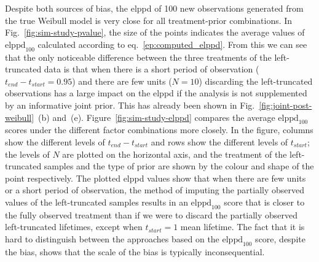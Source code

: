 Despite both sources of bias, the elppd of 100 new observations generated from the true Weibull model is very close for all treatment-prior combinations. In Fig.~\ref{fig:sim-study-pvalue}, the size of the points indicates the average values of $\text{elppd}_{100}$ calculated according to eq.~\eqref{ep:computed_elppd}. From this we can see that the only noticeable difference between the three treatments of the left-truncated data is that when there is a short period of observation ($t_{end} - t_{start} = 0.95$) and there are few units ($N = 10$) discarding the left-truncated observations has a large impact on the elppd if the analysis is not supplemented by an informative joint prior. This has already been shown in Fig.~\ref{fig:joint-post-weibull}~(b) and~(e). Figure~\ref{fig:sim-study-elppd} compares the average $\text{elppd}_{100}$ scores under the different factor combinations more closely. In the figure, columns show the different levels of $t_{end} - t_{start}$ and rows show the different levels of $t_{start}$; the levels of $N$ are plotted on the horizontal axis, and the treatment of the left-truncated samples and the type of prior are shown by the colour and shape of the point respectively. The plotted elppd values show that when there are few units or a short period of observation, the method of imputing the partially observed values of the left-truncated samples results in an $\text{elppd}_{100}$ score that is closer to the fully observed treatment than if we were to discard the partially observed left-truncated lifetimes, except when $t_{start} = 1$ mean lifetime. The fact that it is hard to distinguish between the approaches based on the $\text{elppd}_{100}$ score, despite the bias, shows that the scale of the bias is typically inconsequential.

